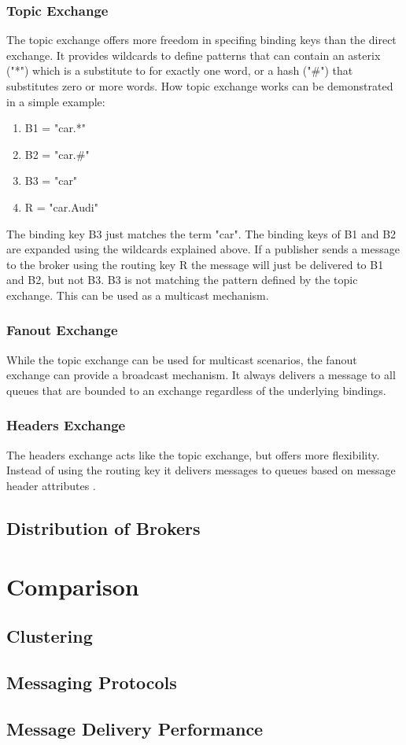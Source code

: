 \subsubsection{Topic Exchange}
The topic exchange offers more freedom in specifing binding keys than the direct exchange. It provides wildcards to define patterns that can contain an asterix ("*") which is a substitute to for exactly one word, or a hash ("\#") that substitutes zero or more words. How topic exchange works can be demonstrated in a simple example:
\begin{enumerate}
	\item B1 = "car.*"
	\item B2 = "car.\#"
	\item B3 = "car"
	\item R = "car.Audi"
\end{enumerate}
The binding key B3 just matches the term "car". The binding keys of B1 and B2 are expanded using the wildcards explained above. If a publisher sends a message to the broker using the routing key R the message will just be delivered to B1 and B2, but not B3. B3 is not matching the pattern defined by the topic exchange. This can be used as a multicast mechanism.

\subsubsection{Fanout Exchange}
While the topic exchange can be used for multicast scenarios, the fanout exchange can provide a broadcast mechanism. It always delivers a message to all queues that are bounded to an exchange regardless of the underlying bindings.

\subsubsection{Headers Exchange}
The headers exchange acts like the topic exchange, but offers more flexibility. Instead of using the routing key it delivers messages to queues based on message header attributes \cite{Toshev2015}.


\subsection{Distribution of Brokers}


\section{Comparison}

\subsection{Clustering}

\subsection{Messaging Protocols}

\subsection{Message Delivery Performance}

